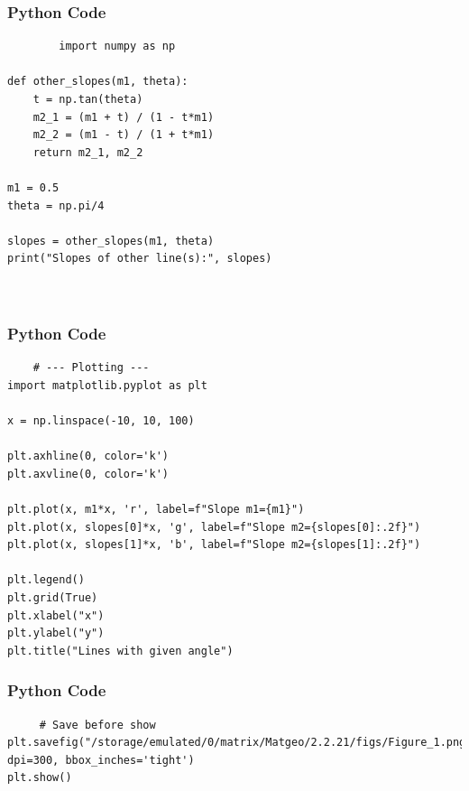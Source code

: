 \documentclass{beamer}
\begin{document}
\begin{frame}[fragile]
    \frametitle{Python Code}
    \begin{lstlisting}
        import numpy as np

def other_slopes(m1, theta):
    t = np.tan(theta)
    m2_1 = (m1 + t) / (1 - t*m1)
    m2_2 = (m1 - t) / (1 + t*m1)
    return m2_1, m2_2

m1 = 0.5
theta = np.pi/4

slopes = other_slopes(m1, theta)
print("Slopes of other line(s):", slopes)



    \end{lstlisting}
\end{frame}

\begin{frame}[fragile]
    \frametitle{Python Code}
    \begin{lstlisting}
    # --- Plotting ---
import matplotlib.pyplot as plt

x = np.linspace(-10, 10, 100)

plt.axhline(0, color='k')
plt.axvline(0, color='k')

plt.plot(x, m1*x, 'r', label=f"Slope m1={m1}")
plt.plot(x, slopes[0]*x, 'g', label=f"Slope m2={slopes[0]:.2f}")
plt.plot(x, slopes[1]*x, 'b', label=f"Slope m2={slopes[1]:.2f}")

plt.legend()
plt.grid(True)
plt.xlabel("x")
plt.ylabel("y")
plt.title("Lines with given angle")
    \end{lstlisting}
\end{frame}

\begin{frame}[fragile]
    \frametitle{Python Code}
    \begin{lstlisting}
     # Save before show
plt.savefig("/storage/emulated/0/matrix/Matgeo/2.2.21/figs/Figure_1.png", dpi=300, bbox_inches='tight')
plt.show()   
    \end{lstlisting}
    
\end{frame}
\end{document}
